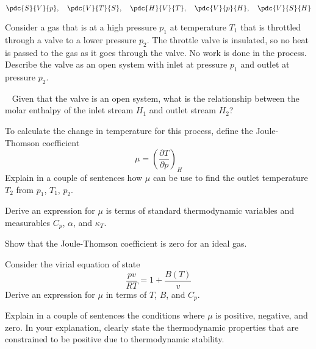 \begin{equation*}
\pdc{S}{V}{p}, \quad
\pdc{V}{T}{S}, \quad
\pdc{H}{V}{T}, \quad
\pdc{V}{p}{H}, \quad
\pdc{V}{S}{H}
\end{equation*}

\bigskip
{}
Consider a gas that is at a high pressure $p_1$ at temperature $T_1$
that is throttled through a valve to a lower pressure $p_2$.
The throttle valve is insulated, so no heat is passed to the gas as it goes through the valve.
No work is done in the process.
Describe the valve as an open system with inlet at pressure $p_1$ and outlet at pressure $p_2$.

\vfil\eject

\ \medskip
\subp
Given that the valve is an open system,
what is the relationship between the molar enthalpy of the inlet stream
$H_{1}$ and outlet stream $H_{2}$?

\smallskip
\subp
To calculate the change in temperature for this process, define the Joule-Thomson coefficient
$$\mu = \left( \frac{\partial T}{\partial p} \right)_{H} $$
Explain in a couple of sentences how $\mu$ can be use to find the outlet temperature $T_{2}$ from $p_{1}$, $T_{1}$, $p_{2}$.

\smallskip
\subp
Derive an expression for $\mu$ is terms of standard thermodynamic variables
and measurables $C_{p}$, $\alpha$, and $\kappa_T$.

\smallskip
\subp
Show that the Joule-Thomson coefficient is zero for an ideal gas.

\smallskip
\subp
Consider the virial equation of state
$$ \frac{pv}{RT} = 1 + \frac{B(T)}{v} $$
Derive an expression for $\mu$ in terms of $T$, $B$, and $C_{p}$.

\smallskip
\subp
Explain in a couple of sentences the conditions where $\mu$ is positive, negative, and zero.
In your explanation, clearly state the thermodynamic properties that
are constrained to be positive due to thermodynamic stability.

